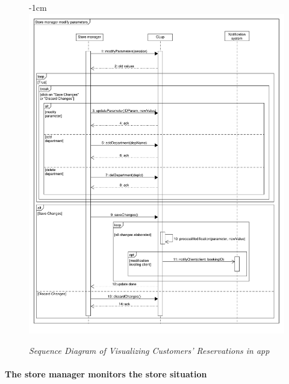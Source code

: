 \documentclass{article}
\begin{document}
\begin{center}
							\begin{figure}[!h]
								\begin{adjustwidth} {-1cm}{}
									\centering
									\includegraphics[scale=0.385]{SD/7_modifyParameters.pdf}\\
									\caption{\emph{Sequence Diagram of Visualizing Customers' Reservations in app}}
								\end{adjustwidth}
							\end{figure}
				\end{center}



			\newpage
			
			\paragraph{The store manager monitors the store situation}
			
\end{document}

